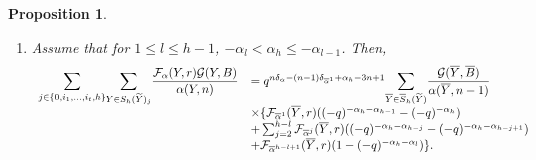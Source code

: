 \documentclass[11pt,oneside]{amsart}
\theoremstyle{plain}
\newtheorem{proposition}[theorem]{Proposition}
\theoremstyle{definition}
\theoremstyle{remark}
\newcommand{\CF}{{\mathcal F}}
\newcommand{\CG}{{\mathcal G}}
\numberwithin{equation}{section}
\begin{document}
\begin{proposition}
		\begin{enumerate}[resume]
			\item 	Assume that for $1 \leq l \leq h-1$, $-\alpha_l<\alpha_h \leq -\alpha_{l-1}$. Then,
			\begin{equation*}\begin{array}{ll}
					\mathlarger{\sum}_{j \in \lbrace 0,i_1,\dots,i_t,h \rbrace}\mathlarger{\sum}_{Y \in S_h(\widetilde{Y})_{j}}	\dfrac{\CF_{\alpha}(Y,r)\CG(Y,B)}{\alpha(Y,n)}&=q^{n\delta_{\alpha}-(n-1)\delta_{\overline{\alpha}^1}+\alpha_h-3n+1}\mathlarger{\sum}_{\overline{Y} \in \overline{S}_h(\widetilde{Y})}\dfrac{\CG(\overline{Y},\overline{B})}{\alpha(\overline{Y},n-1)}
					\\ &\times \lbrace \CF_{\overline{\alpha}^{1}}(\overline{Y},r)((-q)^{-\alpha_h-\alpha_{h-1}}-(-q)^{-\alpha_h})\\
					&+\sum_{j=2}^{h-l} \CF_{\overline{\alpha}^{j}}(\overline{Y},r)((-q)^{-\alpha_h-\alpha_{h-j}}-(-q)^{-\alpha_h-\alpha_{h-j+1}})\\
					&+\CF_{\overline{\alpha}^{h-l+1}}(\overline{Y},r)(1-(-q)^{-\alpha_h-\alpha_{l}}) \rbrace.
				\end{array}
			\end{equation*}	
		\end{enumerate}
	\end{proposition}
\end{document}

